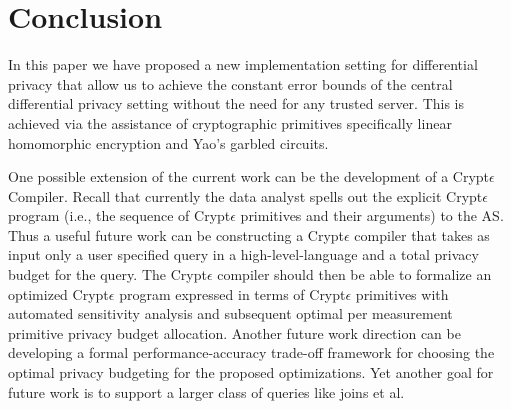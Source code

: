 \section{Conclusion}
In this paper we have proposed a new implementation setting for differential privacy that allow us to achieve the constant error bounds of the central differential privacy setting without the need for any trusted server. This is achieved via the assistance of cryptographic primitives specifically linear homomorphic encryption and Yao's garbled circuits. 
\par One possible extension of the current work can be the development of a
Crypt$\epsilon$ Compiler. Recall that currently the data analyst spells out the explicit Crypt$\epsilon$ program  (i.e., the sequence of Crypt$\epsilon$ primitives and their arguments) to the \textsf{AS}. Thus a useful future work can be constructing a Crypt$\epsilon$ compiler that takes as input only a user specified query in a high-level-language and a total privacy budget for the query. The Crypt$\epsilon$
compiler should then be able to formalize an optimized Crypt$\epsilon$ program expressed in terms of Crypt$\epsilon$ primitives with automated sensitivity analysis and subsequent optimal per measurement primitive privacy budget allocation. 
Another future work direction can be developing a formal performance-accuracy trade-off framework for choosing the optimal privacy budgeting for the proposed optimizations. Yet another goal for future work is to support a larger class of queries like joins et al.